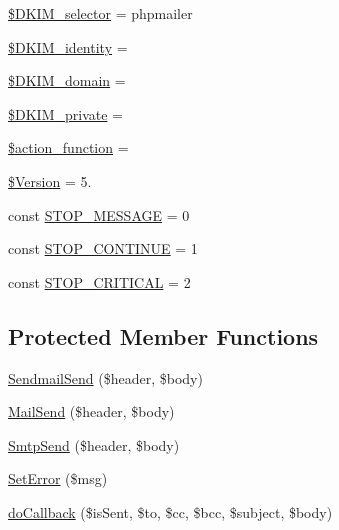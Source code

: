\begin{DoxyCompactItemize}
\item 
\hyperlink{class_p_h_p_mailer_ac21e5612fa66eeeee43467525e6c393d}{\$\+D\+K\+I\+M\+\_\+selector} = \textquotesingle{}phpmailer\textquotesingle{}
\item 
\hyperlink{class_p_h_p_mailer_a677f605bf9bb29be802c5d17d8a0a22c}{\$\+D\+K\+I\+M\+\_\+identity} = \textquotesingle{}\textquotesingle{}
\item 
\hyperlink{class_p_h_p_mailer_a1e49cdb6cd38fc496bd5a93092cac0e7}{\$\+D\+K\+I\+M\+\_\+domain} = \textquotesingle{}\textquotesingle{}
\item 
\hyperlink{class_p_h_p_mailer_ac465c52f2f7ee6eade05ce0a65fbca61}{\$\+D\+K\+I\+M\+\_\+private} = \textquotesingle{}\textquotesingle{}
\item 
\hyperlink{class_p_h_p_mailer_aa39c535046aa8919dc46727723a94a4a}{\$action\+\_\+function} = \textquotesingle{}\textquotesingle{}
\item 
\hyperlink{class_p_h_p_mailer_a8a43e1c8b245951155d04b279276af95}{\$\+Version} = \textquotesingle{}5.\textquotesingle{}
\item 
const \hyperlink{class_p_h_p_mailer_a18ac47549c5fb56a395b374b3c23f04f}{S\+T\+O\+P\+\_\+\+M\+E\+S\+S\+A\+G\+E} = 0
\item 
const \hyperlink{class_p_h_p_mailer_afd1dcd18845b2e660d89726b20cd566e}{S\+T\+O\+P\+\_\+\+C\+O\+N\+T\+I\+N\+U\+E} = 1
\item 
const \hyperlink{class_p_h_p_mailer_a9f37e989efccad58c693cdb0481c881f}{S\+T\+O\+P\+\_\+\+C\+R\+I\+T\+I\+C\+A\+L} = 2
\end{DoxyCompactItemize}
\subsection*{Protected Member Functions}
\begin{DoxyCompactItemize}
\item 
\hyperlink{class_p_h_p_mailer_a139a7117647d88bfdbc3fe1e212330bd}{Sendmail\+Send} (\$header, \$body)
\item 
\hyperlink{class_p_h_p_mailer_aba60ad3b238e4cc556eca92283741bb9}{Mail\+Send} (\$header, \$body)
\item 
\hyperlink{class_p_h_p_mailer_a4a1f26533fba9015399ab2c0164a887a}{Smtp\+Send} (\$header, \$body)
\item 
\hyperlink{class_p_h_p_mailer_a8fed8878364a8f51c035912b9221e2d9}{Set\+Error} (\$msg)
\item 
\hyperlink{class_p_h_p_mailer_a390bb4f6613e7ec10ac26a0871ad7c2e}{do\+Callback} (\$is\+Sent, \$to, \$cc, \$bcc, \$subject, \$body)
\end{DoxyCompactItemize}
